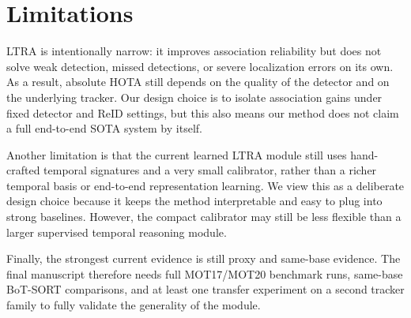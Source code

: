 \section{Limitations}
LTRA is intentionally narrow: it improves association reliability but does not solve weak detection, missed detections, or severe localization errors on its own. As a result, absolute HOTA still depends on the quality of the detector and on the underlying tracker. Our design choice is to isolate association gains under fixed detector and ReID settings, but this also means our method does not claim a full end-to-end SOTA system by itself.

Another limitation is that the current learned LTRA module still uses hand-crafted temporal signatures and a very small calibrator, rather than a richer temporal basis or end-to-end representation learning. We view this as a deliberate design choice because it keeps the method interpretable and easy to plug into strong baselines. However, the compact calibrator may still be less flexible than a larger supervised temporal reasoning module.

Finally, the strongest current evidence is still proxy and same-base evidence. The final manuscript therefore needs full MOT17/MOT20 benchmark runs, same-base BoT-SORT comparisons, and at least one transfer experiment on a second tracker family to fully validate the generality of the module.
